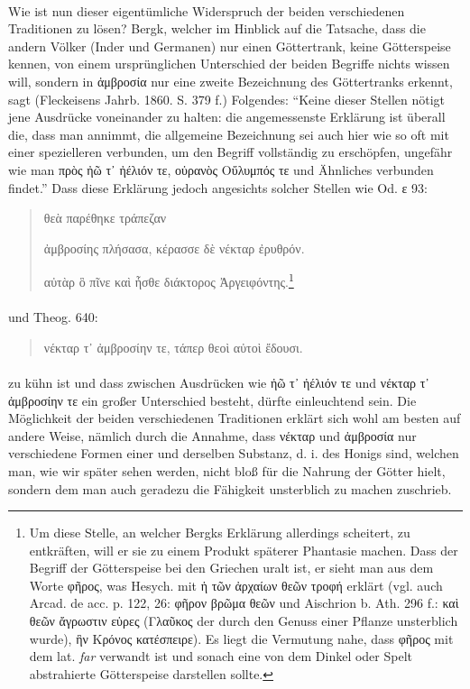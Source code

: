 \documentclass[a4paper, 11pt, oneside]{article}
\begin{document}
\paragraph{}
Wie ist nun dieser eigentümliche Widerspruch der beiden verschiedenen Traditionen zu lösen? Bergk, welcher im Hinblick auf die Tatsache, dass die andern Völker (Inder und Germanen) nur einen Göttertrank, keine Götterspeise kennen, von einem ursprünglichen Unterschied der beiden Begriffe nichts wissen will, sondern in ἀμβροσία nur eine zweite Bezeichnung des Göttertranks erkennt, sagt (Fleckeisens Jahrb. 1860. S. 379 f.) Folgendes: "`Keine dieser Stellen nötigt jene Ausdrücke voneinander zu halten: die angemessenste Erklärung ist überall die, dass man annimmt, die allgemeine Bezeichnung sei auch hier wie so oft mit einer spezielleren verbunden, um den Begriff vollständig zu erschöpfen, ungefähr wie man πρὸς ἠῶ τ᾽ ἠέλιόν τε, οὐρανὸς Οὔλυμπός τε und Ähnliches verbunden findet."' Dass diese Erklärung jedoch angesichts solcher Stellen wie Od. ε 93:
\begin{quotation}
\hspace*{15mm}θεὰ παρέθηκε τράπεζαν

ἀμβροσίης πλήσασα, κέρασσε δὲ νέκταρ ἐρυθρόν.

αὐτὰρ ὃ πῖνε καὶ ἦσθε διάκτορος Ἀργειφόντης.\footnote{Um diese Stelle, an welcher Bergks Erklärung allerdings scheitert, zu entkräften, will er sie zu einem Produkt späterer Phantasie machen. Dass der Begriff der Götterspeise bei den Griechen uralt ist, er sieht man aus dem Worte φῆρος, was Hesych. mit ἡ τῶν ἀρχαίων θεῶν τροφή erklärt (vgl. auch Arcad. de acc. p. 122, 26: φῆρον βρῶμα θεῶν und Aischrion b. Ath. 296 f.: καὶ θεῶν ἄγρωστιν εὑρες (Γλαῦκος der durch den Genuss einer Pflanze unsterblich wurde), ἣν Κρόνος κατέσπειρε). Es liegt die Vermutung nahe, dass φῆρος mit dem lat. \emph{far} verwandt ist und sonach eine von dem Dinkel oder Spelt abstrahierte Götterspeise darstellen sollte.}
\end{quotation}
\paragraph{}
und Theog. 640:
\begin{quotation}
νέκταρ τ᾽ ἀμβροσίην τε, τάπερ θεοὶ αὐτοὶ ἔδουσι.
\end{quotation}
\paragraph{}
zu kühn ist und dass zwischen Ausdrücken wie ἠῶ τ᾽ ἠέλιόν τε und νέκταρ τ᾽ ἀμβροσίην τε ein großer Unterschied besteht, dürfte einleuchtend sein. Die Möglichkeit der beiden verschiedenen Traditionen erklärt sich wohl am besten auf andere Weise, nämlich durch die Annahme, dass νέκταρ und ἀμβροσία nur verschiedene Formen einer und derselben Substanz, d. i. des Honigs sind, welchen man, wie wir später sehen werden, nicht bloß für die Nahrung der Götter hielt, sondern dem man auch geradezu die Fähigkeit unsterblich zu machen zuschrieb.
\end{document}
